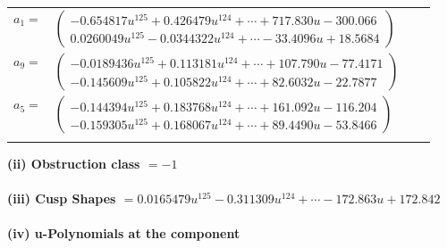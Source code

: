 \documentclass[1p]{elsarticle_modified}
\theoremstyle{definition}
\begin{document}
\begin{tabular}{m{7pt} m{180pt} m{7pt} m{180pt} }
\flushright $a_{1}=$&$\begin{pmatrix}-0.654817 u^{125}+0.426479 u^{124}+\cdots+717.830 u-300.066\\0.0260049 u^{125}-0.0344322 u^{124}+\cdots-33.4096 u+18.5684\end{pmatrix}$ \\
\flushright $a_{9}=$&$\begin{pmatrix}-0.0189436 u^{125}+0.113181 u^{124}+\cdots+107.790 u-77.4171\\-0.145609 u^{125}+0.105822 u^{124}+\cdots+82.6032 u-22.7877\end{pmatrix}$ \\
\flushright $a_{5}=$&$\begin{pmatrix}-0.144394 u^{125}+0.183768 u^{124}+\cdots+161.092 u-116.204\\-0.159305 u^{125}+0.168067 u^{124}+\cdots+89.4490 u-53.8466\end{pmatrix}$\\&\end{tabular}
\flushleft \textbf{(ii) Obstruction class $= -1$}\\~\\
\flushleft \textbf{(iii) Cusp Shapes $= 0.0165479 u^{125}-0.311309 u^{124}+\cdots-172.863 u+172.842$}\\~\\
\newpage\renewcommand{\arraystretch}{1}
\flushleft \textbf{(iv) u-Polynomials at the component}\newline \\
\end{document}
